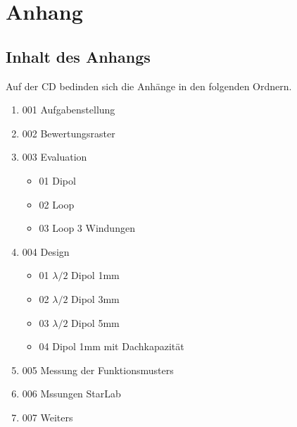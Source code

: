 \chapter{Anhang}
\section{Inhalt des Anhangs}
Auf der CD bedinden sich die Anhänge in den folgenden Ordnern.
\begin{enumerate}
\item[] 001 Aufgabenstellung
\item[] 002 Bewertungsraster
\item[] 003 Evaluation
	\begin{itemize}
		\item[] 01 Dipol
		\item[] 02 Loop
		\item[] 03 Loop 3 Windungen
	\end{itemize}
\item[] 004 Design
	\begin{itemize}
		\item[] 01 $\lambda/2$ Dipol 1mm
		\item[] 02 $\lambda/2$ Dipol 3mm
		\item[] 03 $\lambda/2$ Dipol 5mm
		\item[] 04 Dipol 1mm mit Dachkapazität
	\end{itemize}
\item[] 005 Messung der Funktionsmusters
\item[] 006 Mssungen StarLab
\item[] 007 Weiters

\end{enumerate}